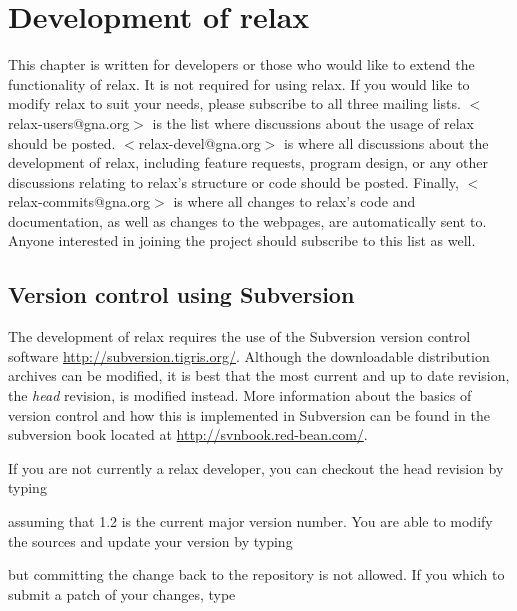 
\chapter{Development of relax}

This chapter is written for developers or those who would like to extend the functionality of relax.  It is not required for using relax.  If you would like to modify relax to suit your needs, please subscribe to all three mailing lists.  $<$relax-users@gna.org$>$ is the list where discussions about the usage of relax should be posted.  $<$relax-devel@gna.org$>$ is where all discussions about the development of relax, including feature requests, program design, or any other discussions relating to relax's structure or code should be posted.  Finally, $<$relax-commits@gna.org$>$ is where all changes to relax's code and documentation, as well as changes to the webpages, are automatically sent to.  Anyone interested in joining the project should subscribe to this list as well.




\section{Version control using Subversion}

The development of relax requires the use of the Subversion version control software \href{http://subversion.tigris.org/}{http://subversion.tigris.org/}.  Although the downloadable distribution archives can be modified, it is best that the most current and up to date revision, the \textit{head} revision, is modified instead.  More information about the basics of version control and how this is implemented in Subversion can be found in the subversion book located at \href{http://svnbook.red-bean.com/}{http://svnbook.red-bean.com/}.

If you are not currently a relax developer, you can checkout the head revision by typing


assuming that 1.2 is the current major version number.  You are able to modify the sources and update your version by typing


but committing the change back to the repository is not allowed.  If you which to submit a patch of your changes, type

